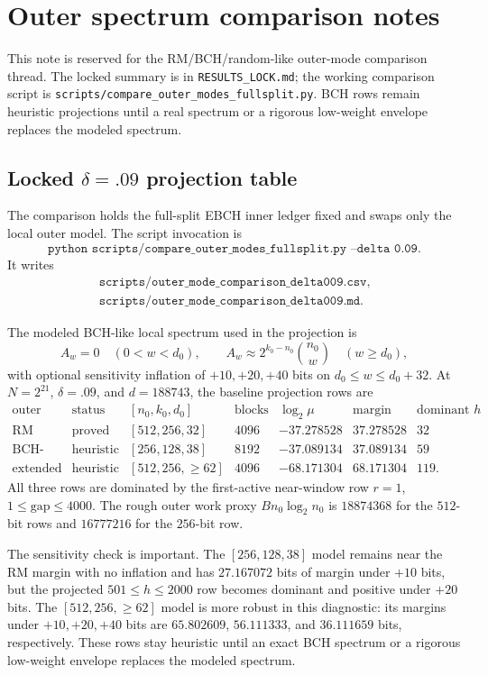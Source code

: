 \section{Outer spectrum comparison notes}
\label{sec:outer-spectrum-comparison-notes}

This note is reserved for the RM/BCH/random-like outer-mode comparison thread.  The locked summary is in
\texttt{RESULTS\_LOCK.md}; the working comparison script is
\texttt{scripts/compare\_outer\_modes\_fullsplit.py}.  BCH rows remain heuristic projections until a real spectrum or a
rigorous low-weight envelope replaces the modeled spectrum.

\subsection{Locked \(\delta=.09\) projection table}

The comparison holds the full-split EBCH inner ledger fixed and swaps only the local outer model.  The script invocation
is
\[
\texttt{python scripts/compare\_outer\_modes\_fullsplit.py --delta 0.09}.
\]
It writes
\[
\begin{gathered}
\texttt{scripts/outer\_mode\_comparison\_delta009.csv},\\
\texttt{scripts/outer\_mode\_comparison\_delta009.md}.
\end{gathered}
\]

The modeled BCH-like local spectrum used in the projection is
\[
A_w=0\quad(0<w<d_0),\qquad
A_w\approx 2^{k_0-n_0}\binom{n_0}{w}\quad(w\ge d_0),
\]
with optional sensitivity inflation of \(+10,+20,+40\) bits on \(d_0\le w\le d_0+32\).  At \(N=2^{21}\),
\(\delta=.09\), and \(d=188743\), the baseline projection rows are
\[
\begin{array}{c|c|c|c|c|c|c}
\text{outer mode} & \text{status} & [n_0,k_0,d_0] & \text{blocks} &
\log_2\mu & \text{margin bits} & \text{dominant }h\\
\hline
\text{RM exact} & \text{proved} & [512,256,32] & 4096 & -37.278528 & 37.278528 & 32\\
\text{BCH-like} & \text{heuristic} & [256,128,38] & 8192 & -37.089134 & 37.089134 & 59\\
\text{extended BCH-like} & \text{heuristic} & [512,256,\ge62] & 4096 & -68.171304 & 68.171304 & 119 .
\end{array}
\]
All three rows are dominated by the first-active near-window row \(r=1\), \(1\le\mathrm{gap}\le4000\).  The rough outer
work proxy \(B n_0\log_2 n_0\) is \(18874368\) for the \(512\)-bit rows and \(16777216\) for the \(256\)-bit row.

The sensitivity check is important.  The \([256,128,38]\) model remains near the RM margin with no inflation and
has \(27.167072\) bits of margin under \(+10\) bits, but the projected \(501\le h\le2000\) row becomes dominant and
positive under \(+20\) bits.  The \([512,256,\ge62]\) model is more robust in this diagnostic: its margins under
\(+10,+20,+40\) bits are \(65.802609\), \(56.111333\), and \(36.111659\) bits, respectively.  These rows stay heuristic
until an exact BCH spectrum or a rigorous low-weight envelope replaces the modeled spectrum.
